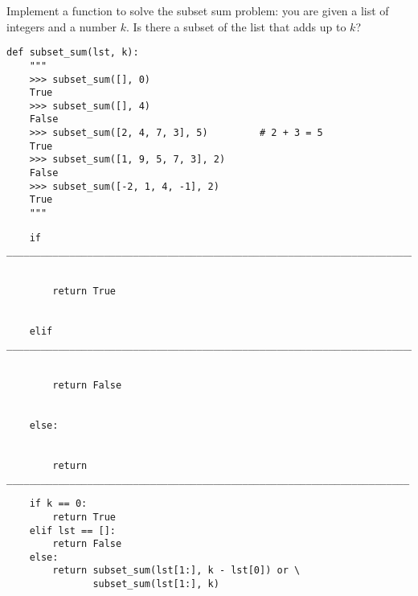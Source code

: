 \question Implement a function to solve the subset sum problem: you are given a
list of integers and a number $k$. Is there a subset of the list that adds up
to $k$?

\begin{lstlisting}
def subset_sum(lst, k):
    """
    >>> subset_sum([], 0)
    True
    >>> subset_sum([], 4)
    False
    >>> subset_sum([2, 4, 7, 3], 5)         # 2 + 3 = 5
    True
    >>> subset_sum([1, 9, 5, 7, 3], 2)
    False
    >>> subset_sum([-2, 1, 4, -1], 2)
    True
    """
\end{lstlisting}
\begin{lstlisting}
    if ______________________________________________________________________________:


        return True


    elif ____________________________________________________________________________:


        return False


    else:


        return ______________________________________________________________________
\end{lstlisting}
\begin{solution}[.5in]
\begin{lstlisting}
    if k == 0:
        return True
    elif lst == []:
        return False
    else:
        return subset_sum(lst[1:], k - lst[0]) or \
               subset_sum(lst[1:], k)
\end{lstlisting}
\end{solution}
